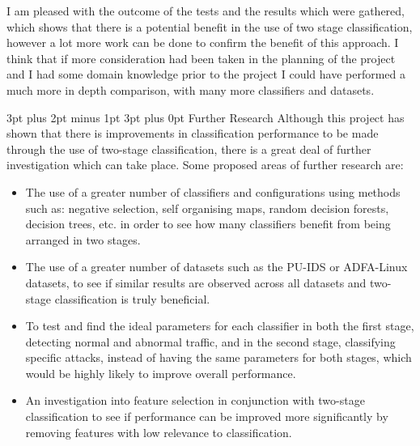 \documentclass[12pt,a4paper]{article}
\makeatletter
\renewcommand\subsection{\@startsection {subsection}{1}{2mm} %
      {3pt plus 2pt minus 1pt} %
      {3pt plus 0pt} %
      {\normalfont\bfseries}}
\makeatother
\begin{document}
I am pleased with the outcome of the tests and the results which were gathered, which shows that there is a potential benefit in the use of two stage classification, however a lot more work can be done to confirm the benefit of this approach. I think that if more consideration had been taken in the planning of the project and I had some domain knowledge prior to the project I could have performed a much more in depth comparison, with many more classifiers and datasets.

\subsection{Further Research}
Although this project has shown that there is improvements in classification performance to be made through the use of two-stage classification, there is a great deal of further investigation which can take place. Some proposed areas of further research are:

\begin{itemize}
	\item{ The use of a greater number of classifiers and configurations using methods such as: negative selection, self organising maps, random decision forests, decision trees, etc. in order to see how many classifiers benefit from being arranged in two stages.}
	\item{ The use of a greater number of datasets such as the PU-IDS or ADFA-Linux datasets, to see if similar results are observed across all datasets and two-stage classification is truly beneficial. }
	\item{To test and find the ideal parameters for each classifier in both the first stage, detecting normal and abnormal traffic, and in the second stage, classifying specific attacks, instead of having the same parameters for both stages, which would be highly likely to improve overall performance.}
	\item{An investigation into feature selection in conjunction with two-stage classification to see if performance can be improved more significantly by removing features with low relevance to classification.}
\end{itemize}

\newpage
	\printbibliography
\newpage
\end{document}
